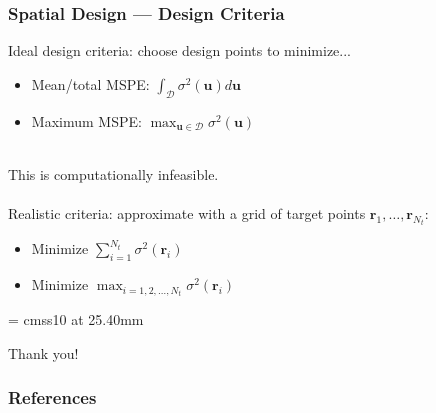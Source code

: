 \documentclass[xcolor=dvipsnames]{beamer}
\begin{document}
\begin{frame}
\frametitle{Spatial Design --- Design Criteria}
Ideal design criteria: choose design points to minimize...
\begin{itemize}
\item Mean/total MSPE: $\int_{\mathcal{D}}\sigma^2(\bm{u})d\bm{u}$
\item Maximum MSPE: $\max_{\bm{u}\in\mathcal{D}}\sigma^2(\bm{u})$\\~\\
\end{itemize}

\pause

This is computationally infeasible. \pause \\~\\

Realistic criteria: approximate with a grid of target points $\bm{r}_1,\dots,\bm{r}_{N_t}$:
\begin{itemize}
\item Minimize $\sum_{i=1}^{N_t}\sigma^2(\bm{r}_i)$ 
\item Minimize $\max_{i=1,2,\dots,N_t}\sigma^2(\bm{r}_i)$
\end{itemize}
\end{frame}


\appendix
{}
\setcounter{finalframe}{\value{framenumber}}

\begin{frame}

      \begin{center}

        \font\endfont = cmss10 at 25.40mm
        \color{MUgold}
        \endfont 
        \baselineskip 20.0mm

        Thank you!

      \end{center}    


\end{frame}

\begin{frame}[allowframebreaks]
        \frametitle{References}
        
        
\end{frame} 
\setcounter{framenumber}{\value{finalframe}}
\end{document}
